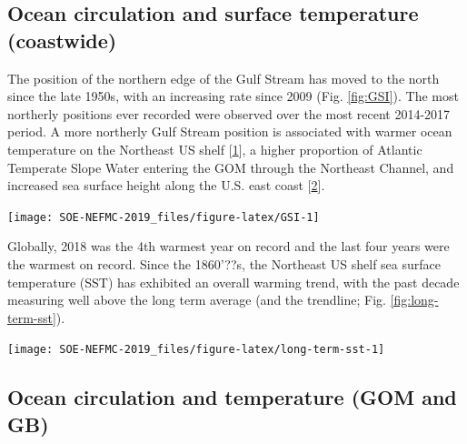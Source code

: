 \documentclass[10pt,]{article}
\let\origfigure\figure
\let\endorigfigure\endfigure
\renewenvironment{figure}[1][2] {
    \expandafter\origfigure\expandafter[H]
} {
    \endorigfigure
}
\begin{document}
\subsection{Ocean circulation and surface temperature
(coastwide)}\label{ocean-circulation-and-surface-temperature-coastwide}

The position of the northern edge of the Gulf Stream has moved to the
north since the late 1950s, with an increasing rate since 2009 (Fig.
\ref{fig:GSI}). The most northerly positions ever recorded were observed
over the most recent 2014-2017 period. A more northerly Gulf Stream
position is associated with warmer ocean temperature on the Northeast US
shelf {[}\protect\hyperlink{ref-zhang_role_2007}{1}{]}, a higher
proportion of Atlantic Temperate Slope Water entering the GOM through
the Northeast Channel, and increased sea surface height along the U.S.
east coast {[}\protect\hyperlink{ref-goddard_extreme_2015}{2}{]}.

\begin{figure}

{\centering \texttt{[image: SOE-NEFMC-2019\_files/figure-latex/GSI-1]} 

}

\caption{Index representing the north wall of the Gulf Stream. Positive values represent a more northerly Gulf Stream position.}\label{fig:GSI}
\end{figure}

Globally, 2018 was the 4th warmest year on record and the last four
years were the warmest on record. Since the 1860'??s, the Northeast US
shelf sea surface temperature (SST) has exhibited an overall warming
trend, with the past decade measuring well above the long term average
(and the trendline; Fig. \ref{fig:long-term-sst}).

\begin{figure}

{\centering \texttt{[image: SOE-NEFMC-2019\_files/figure-latex/long-term-sst-1]} 

}

\caption{Average annual sea surface temperature (SST) over the Northeast US Shelf}\label{fig:long-term-sst}
\end{figure}

\subsection{Ocean circulation and temperature (GOM and
GB)}\label{ocean-circulation-and-temperature-gom-and-gb}
\end{document}
